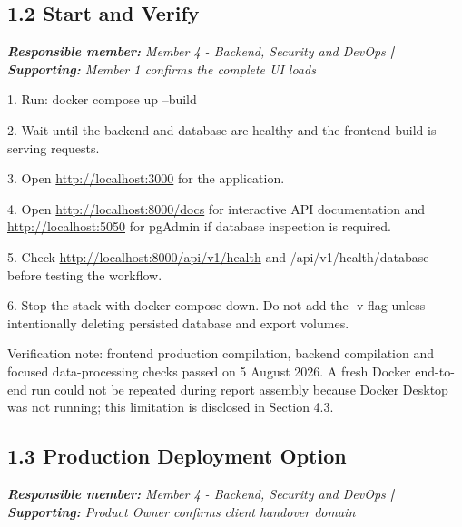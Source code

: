 \documentclass[11pt,a4paper]{article}
\begin{document}
\subsection*{1.2 Start and Verify}


\noindent\textit{\textbf{Responsible member: }Member 4 - Backend, Security and DevOps\textbf{ | Supporting: }Member 1 confirms the complete UI loads}\par

1.  Run: docker compose up --build\par

2.  Wait until the backend and database are healthy and the frontend build is serving requests.\par

3.  Open \url{http://localhost:3000} for the application.\par

4.  Open \url{http://localhost:8000/docs} for interactive API documentation and \url{http://localhost:5050} for pgAdmin if database inspection is required.\par

5.  Check \url{http://localhost:8000/api/v1/health} and /api/v1/health/database before testing the workflow.\par

6.  Stop the stack with docker compose down. Do not add the -v flag unless intentionally deleting persisted database and export volumes.\par

Verification note: frontend production compilation, backend compilation and focused data-processing checks passed on 5 August 2026. A fresh Docker end-to-end run could not be repeated during report assembly because Docker Desktop was not running; this limitation is disclosed in Section 4.3.\par

\subsection*{1.3 Production Deployment Option}


\noindent\textit{\textbf{Responsible member: }Member 4 - Backend, Security and DevOps\textbf{ | Supporting: }Product Owner confirms client handover domain}\par
\end{document}
